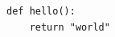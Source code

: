 \documentclass{article}
\begin{document}
\begin{verbatim}
def hello():
    return "world"
\end{verbatim}
\end{document}
